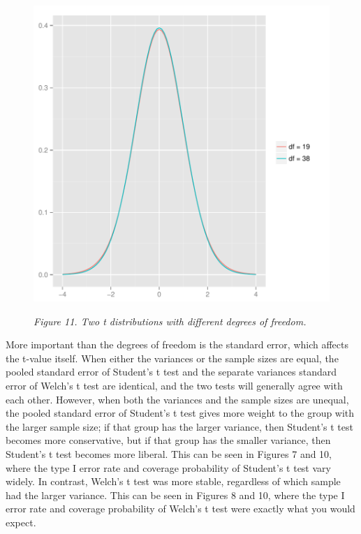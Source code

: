 \documentclass[man,a4paper,noextraspace,apacite]{apa6}
\begin{document}
\begin{figure}  
\includegraphics{WelchManuscript-abridged-tdist}

\textit{Figure 11. Two t distributions with different degrees of freedom.}
\end{figure}
    
    More important than the degrees of freedom is the standard error, which affects the t-value itself. When either the variances or the sample sizes are equal, the pooled standard error of Student's t test and the separate variances standard error of Welch's t test are identical, and the two tests will generally agree with each other. However, when both the variances and the sample sizes are unequal, the pooled standard error of Student's t test gives more weight to the group with the larger sample size; if that group has the larger variance, then Student's t test becomes more conservative, but if that group has the smaller variance, then Student's t test becomes more liberal. This can be seen in Figures 7 and 10, where the type I error rate and coverage probability of Student's t test vary widely. In contrast, Welch's t test was more stable, regardless of which sample had the larger variance. This can be seen in Figures 8 and 10, where the type I error rate and coverage probability of Welch's t test were exactly what you would expect.
    
\end{document}
